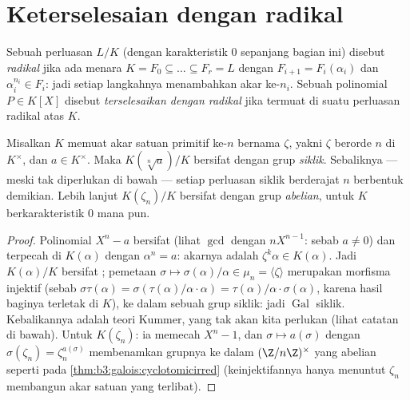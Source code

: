 \section{Keterselesaian dengan radikal}

\begin{definition}\label{def:b3:galois:radical}
Sebuah perluasan $L/K$ (dengan karakteristik $0$ sepanjang bagian ini)
disebut \emph{radikal} jika ada menara $K = F_0 \subseteq \dots
\subseteq F_r = L$ dengan $F_{i+1} = F_i(\alpha_i)$ dan
$\alpha_i^{n_i} \in F_i$: jadi setiap langkahnya menambahkan akar ke-$n_i$. Sebuah
polinomial $P \in K[X]$ disebut \emph{terselesaikan dengan
radikal} jika 
termuat di suatu perluasan radikal atas $K$.
\end{definition}

\begin{lemma}\label{lem:b3:galois:cyclicsteps}
Misalkan $K$ memuat akar satuan primitif ke-$n$ bernama $\zeta$, yakni
$\zeta$ berorde $n$ di $K^\times$, dan $a \in K^\times$. Maka
$K(\sqrt[n]a)/K$ bersifat  dengan grup \emph{siklik}. Sebaliknya
--- meski tak diperlukan di bawah --- setiap perluasan siklik berderajat $n$
berbentuk demikian. Lebih lanjut $K(\zeta_n)/K$ bersifat  dengan grup
\emph{abelian}, untuk $K$ berkarakteristik $0$ mana pun.
\end{lemma}

\begin{proof}
Polinomial $X^n - a$ bersifat  (lihat $\gcd$ dengan $nX^{n-1}$: sebab $a \neq 0$) dan
terpecah di $K(\alpha)$ dengan $\alpha^n = a$: akarnya adalah
$\zeta^k\alpha \in K(\alpha)$. Jadi $K(\alpha)/K$ bersifat ;
pemetaan $\sigma \mapsto \sigma(\alpha)/\alpha \in \mu_n = \langle
\zeta\rangle$ merupakan morfisma injektif (sebab $\sigma\tau(\alpha) =
\sigma(\tau(\alpha)/\alpha \cdot \alpha) =
\tau(\alpha)/\alpha\cdot\sigma(\alpha)$, karena hasil baginya terletak di
$K$), ke dalam sebuah grup siklik: jadi $\operatorname{Gal}$ siklik.
Kebalikannya adalah teori Kummer, yang tak akan kita perlukan (lihat
catatan di bawah). Untuk $K(\zeta_n)$: ia memecah  $X^n -
1$, dan $\sigma \mapsto a(\sigma)$ dengan $\sigma(\zeta_n) =
\zeta_n^{a(\sigma)}$ membenamkan grupnya ke dalam
$(\Z/n\Z)^\times$ yang abelian seperti pada \cref{thm:b3:galois:cyclotomicirred}
(keinjektifannya hanya menuntut $\zeta_n$ membangun akar
satuan yang terlibat).
\end{proof}

